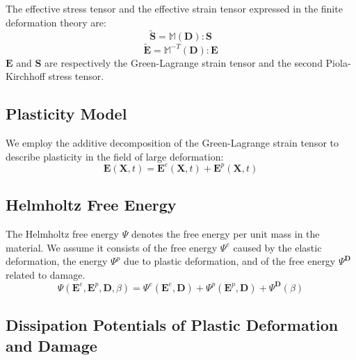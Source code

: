 \documentclass[11pt,fullpage]{article}
\begin{document}
The effective stress tensor and the effective strain tensor expressed
in the finite deformation theory are:
$$
\tilde{\bm{S}} = \mathbb{M}(\bm{D}):\bm{S}
$$
$$
\tilde{\bm{E}} = \mathbb{M}^{-T}(\bm{D}):\bm{E}
$$
$\bm{E}$ and $\bm{S}$ are respectively the Green-Lagrange strain
tensor and the second Piola-Kirchhoff stress tensor.

\subsection{Plasticity Model}

We employ the additive decomposition of the Green-Lagrange strain tensor
to describe plasticity in the field of large deformation:
$$
\bm{E}(\bm{X},t) = \bm{E}^e(\bm{X},t)+\bm{E}^p(\bm{X},t)
$$

\subsection{Helmholtz Free Energy}

The Helmholtz free energy $\Psi$ denotes the free energy per unit mass
in the material. We assume it consists of the free energy
$\Psi^{e}$ caused by the elastic deformation, the energy
$\Psi^{p}$ due to plastic deformation, and of the free energy
$\Psi^{\bm{D}}$ related to damage.
$$
\Psi(\bm{E}^e,\bm{E}^p,\bm{D},\beta) = \Psi^{e}(\bm{E}^e,\bm{D}) + \Psi^{p}(\bm{E}^p,\bm{D}) + \Psi^{\bm{D}}(\beta)
$$

\subsection{Dissipation Potentials of Plastic Deformation and Damage}



\end{document}
